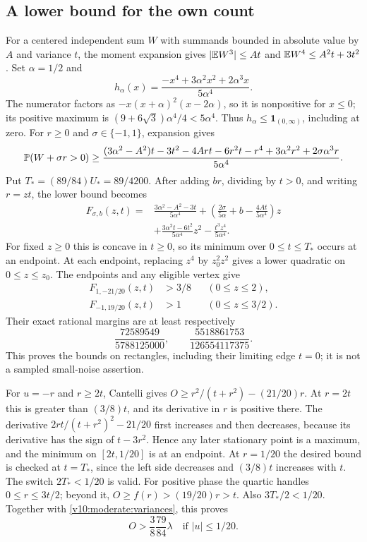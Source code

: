 \subsection{A lower bound for the own count}
For a centered independent sum $W$ with summands bounded in absolute
value by $A$ and variance $t$, the moment expansion gives
$|\mathbb E W^3|\le At$ and $\mathbb E W^4\le A^2t+3t^2$.
Set $\alpha=1/2$ and
\[
 h_\alpha(x)=\frac{-x^4+3\alpha^2x^2+2\alpha^3x}{5\alpha^4}.
\]
The numerator factors as $-x(x+\alpha)^2(x-2\alpha)$, so it is
nonpositive for $x\le0$; its positive maximum is
$(9+6\sqrt3)\alpha^4/4<5\alpha^4$.
Thus $h_\alpha\le\mathbf1_{(0,\infty)}$, including at zero. For
$r\ge0$ and $\sigma\in\{-1,1\}$, expansion gives
\[
 \mathbb P(W+\sigma r>0)\ge
 \frac{(3\alpha^2-A^2)t-3t^2-4Art-6r^2t-r^4
                  +3\alpha^2r^2+2\sigma\alpha^3r}{5\alpha^4}.
\]
Put $T_*=(89/84)U_*=89/4200$. After adding $br$, dividing by
$t>0$, and writing $r=zt$, the lower bound becomes
\begin{align*}
 F_{\sigma,b}(z,t)={}&\frac{3\alpha^2-A^2-3t}{5\alpha^4}
 +\left(\frac{2\sigma}{5\alpha}+b-\frac{4At}{5\alpha^4}\right)z\\
 &+\frac{3\alpha^2t-6t^2}{5\alpha^4}z^2
       -\frac{t^3z^4}{5\alpha^4}.
\end{align*}
For fixed $z\ge0$ this is concave in $t\ge0$, so its minimum over
$0\le t\le T_*$ occurs at an endpoint. At each endpoint, replacing
$z^4$ by $z_0^2z^2$ gives a lower quadratic on $0\le z\le z_0$.
The endpoints and any eligible vertex give
\begin{align*}
 F_{1,-21/20}(z,t)&>3/8 &&(0\le z\le2),\\
 F_{-1,19/20}(z,t)&>1 &&(0\le z\le3/2).
\end{align*}
Their exact rational margins are at least respectively
\[
 \frac{72589549}{5788125000},\qquad \frac{5518861753}{126554117375}.
\]
This proves the bounds on rectangles, including their limiting edge
$t=0$; it is not a sampled small-noise assertion.

For $u=-r$ and $r\ge2t$, Cantelli gives
$O\ge r^2/(t+r^2)-(21/20)r$. At $r=2t$ this is greater than
$(3/8)t$, and its derivative in $r$ is positive there. The derivative
$2rt/(t+r^2)^2-21/20$ first increases and then decreases, because its
derivative has the sign of $t-3r^2$. Hence any later stationary point
is a maximum, and the minimum on $[2t,1/20]$ is at an endpoint.
At $r=1/20$ the desired bound is checked at $t=T_*$, since the left
side decreases and $(3/8)t$ increases with $t$.
The switch $2T_*<1/20$ is valid. For positive phase the quartic
handles $0\le r\le3t/2$; beyond it,
$O\ge f(r)>(19/20)r>t$. Also $3T_*/2<1/20$.
Together with \eqref{v10:moderate:variances}, this proves
\begin{equation}\label{v10:moderate:own}
                  O>\frac38\frac{79}{84}\lambda
                         \quad\text{if }|u|\le1/20.
\end{equation}

